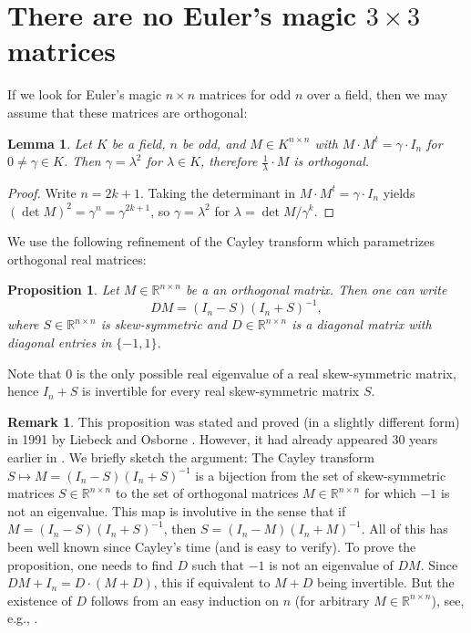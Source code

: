 \documentclass[12pt]{amsart}
\newtheorem{lemma}[theorem]{Lemma}
\newtheorem{proposition}[theorem]{Proposition}
\theoremstyle{definition}
\newtheorem{remark}[theorem]{Remark}
\newcommand{\RR}{\mathbb R}
\newcommand*{\set}[1]{\{#1\}}
\begin{document}
\section{There are no Euler's magic \texorpdfstring{$3\times3$}{3}
  matrices}
If we look for Euler's magic $n\times n$ matrices for odd $n$ over a
field, then we may assume that these matrices are orthogonal:
\begin{lemma}\label{lem:ortho}
  Let $K$ be a field, $n$ be odd, and $M\in K^{n\times n}$ with
  $M\cdot M^t=\gamma\cdot I_n$ for $0\ne\gamma\in K$. Then
  $\gamma=\lambda^2$ for $\lambda\in K$, therefore
  $\frac{1}{\lambda}\cdot M$ is orthogonal.
\end{lemma}
\begin{proof}
  Write $n=2k+1$. Taking the determinant in
  $M\cdot M^t=\gamma\cdot I_n$ yields
  $(\det M)^2=\gamma^n=\gamma^{2k+1}$, so $\gamma=\lambda^2$ for
  $\lambda=\det M/\gamma^k$.
\end{proof}
We use the following refinement of the Cayley transform which
parametrizes orthogonal real matrices:
\begin{proposition}\label{prop:cayley}
  Let $M\in\RR^{n\times n}$ be a an orthogonal matrix. Then one can write
  \[
    DM=(I_n-S)(I_n+S)^{-1},
  \]
  where $S\in\RR^{n\times n}$ is skew-symmetric and
  $D\in\RR^{n\times n}$ is a diagonal matrix with diagonal entries in
  $\set{-1,1}$.
\end{proposition}
Note that $0$ is the only possible real eigenvalue of a real
skew-symmetric matrix, hence $I_n+S$ is invertible for every real
skew-symmetric matrix $S$.
\begin{remark}
  This proposition was stated and proved (in a slightly different
  form) in 1991 by Liebeck and Osborne
  \cite{liebeck_osborbe:amm}. However, it had already appeared 30
  years earlier in \cite[Chapter 6, Section 4, Exercises 7 --
  11]{bellman:book}. We briefly sketch the argument: The Cayley
  transform $S\mapsto M=(I_n-S)(I_n+S)^{-1}$ is a bijection from the
  set of skew-symmetric matrices $S\in\RR^{n\times n}$ to the set of
  orthogonal matrices $M\in\RR^{n\times n}$ for which $-1$ is not an
  eigenvalue. This map is involutive in the sense that if
  $M=(I_n-S)(I_n+S)^{-1}$, then $S=(I_n-M)(I_n+M)^{-1}$. All of this
  has been well known since Cayley's time (and is easy to verify). To
  prove the proposition, one needs to find $D$ such that $-1$ is not
  an eigenvalue of $DM$. Since $DM+I_n=D\cdot(M+D)$, this if
  equivalent to $M+D$ being invertible. But the existence of $D$
  follows from an easy induction on $n$ (for arbitrary
  $M\in\RR^{n\times n}$), see, e.g., \cite[Lemma 1]{hsu:matrices}.
\end{remark}
\end{document}
